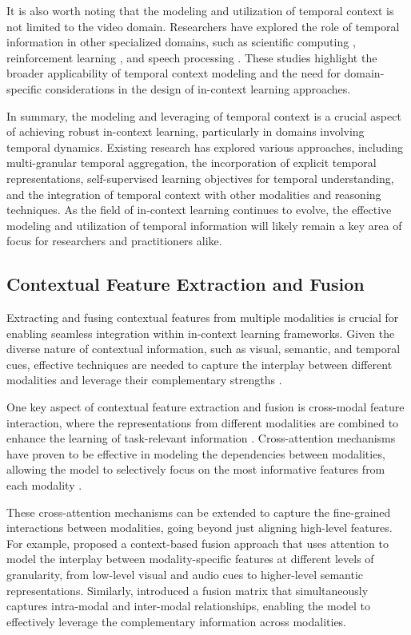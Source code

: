 \documentclass[11pt]{article}
\begin{document}
It is also worth noting that the modeling and utilization of temporal context is not limited to the video domain. Researchers have explored the role of temporal information in other specialized domains, such as scientific computing \cite{ref164}, reinforcement learning \cite{ref165}, and speech processing \cite{ref166}. These studies highlight the broader applicability of temporal context modeling and the need for domain-specific considerations in the design of in-context learning approaches.

In summary, the modeling and leveraging of temporal context is a crucial aspect of achieving robust in-context learning, particularly in domains involving temporal dynamics. Existing research has explored various approaches, including multi-granular temporal aggregation, the incorporation of explicit temporal representations, self-supervised learning objectives for temporal understanding, and the integration of temporal context with other modalities and reasoning techniques. As the field of in-context learning continues to evolve, the effective modeling and utilization of temporal information will likely remain a key area of focus for researchers and practitioners alike.

\subsection{Contextual Feature Extraction and Fusion}

Extracting and fusing contextual features from multiple modalities is crucial for enabling seamless integration within in-context learning frameworks. Given the diverse nature of contextual information, such as visual, semantic, and temporal cues, effective techniques are needed to capture the interplay between different modalities and leverage their complementary strengths \cite{ref167,ref168}.

One key aspect of contextual feature extraction and fusion is cross-modal feature interaction, where the representations from different modalities are combined to enhance the learning of task-relevant information \cite{ref40,ref169}. Cross-attention mechanisms have proven to be effective in modeling the dependencies between modalities, allowing the model to selectively focus on the most informative features from each modality \cite{ref170,ref171}.

These cross-attention mechanisms can be extended to capture the fine-grained interactions between modalities, going beyond just aligning high-level features. For example, \cite{ref172} proposed a context-based fusion approach that uses attention to model the interplay between modality-specific features at different levels of granularity, from low-level visual and audio cues to higher-level semantic representations. Similarly, \cite{ref173} introduced a fusion matrix that simultaneously captures intra-modal and inter-modal relationships, enabling the model to effectively leverage the complementary information across modalities.
\end{document}
